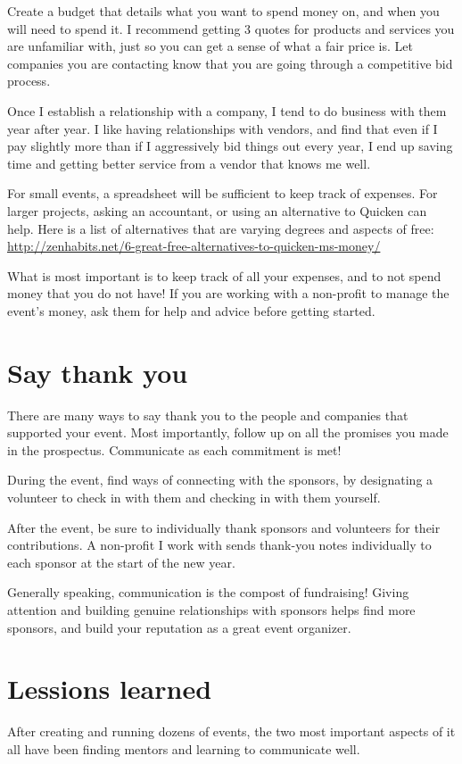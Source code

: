 Create a budget that details what you want to spend money on, and when you will need to spend it. I recommend getting 3 quotes for products and services you are unfamiliar with, just so you can get a sense of what a fair price is. Let companies you are contacting know that you are going through a competitive bid process. 

Once I establish a relationship with a company, I tend to do business with them year after year. I like having relationships with vendors, and find that even if I pay slightly more than if I aggressively bid things out every year, I end up saving time and getting better service from a vendor that knows me well. 

For small events, a spreadsheet will be sufficient to keep track of expenses. For larger projects, asking an accountant, or using an alternative to Quicken can help. Here is a list of alternatives that are varying degrees and aspects of free: \url{http://zenhabits.net/6-great-free-alternatives-to-quicken-ms-money/}

What is most important is to keep track of all your expenses, and to not spend money that you do not have! If you are working with a non-profit to manage the event’s money, ask them for help and advice before getting started.

\section*{Say thank you}
There are many ways to say thank you to the people and companies that supported your event. Most importantly, follow up on all the promises you made in the prospectus. Communicate as each commitment is met!

During the event, find ways of connecting with the sponsors, by designating a volunteer to check in with them and checking in with them yourself.

After the event, be sure to individually thank sponsors and volunteers for their contributions. A non-profit I work with sends thank-you notes individually to each sponsor at the start of the new year.

Generally speaking, communication is the compost of fundraising! Giving attention and building genuine relationships with sponsors helps find more sponsors, and build your reputation as a great event organizer.

\section*{Lessions learned}
After creating and running dozens of events, the two most important aspects of it all have been finding mentors and learning to communicate well. 

